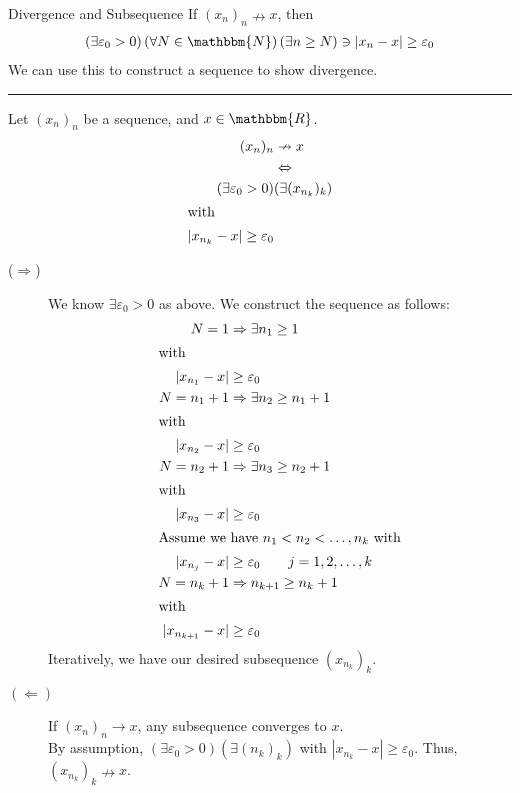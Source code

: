 \documentclass[10pt]{extarticle}
\newcommand{\N}{\mathbbm{N}}
\newcommand{\R}{\mathbbm{R}}
\begin{document}
  \begin{problem}{Divergence and Subsequence}
    If $(x_n)_n \nrightarrow x$, then
    \begin{align*}
      \left(\exists \varepsilon_0> 0\right)\left(\forall N\in\N\right)\left(\exists n\geq N\right) \ni |x_n-x| \geq \varepsilon_0
    \end{align*}
    We can use this to construct a sequence to show divergence.\\
    \vspace{4pt}
    \rule{\textwidth}{0.4pt}
    \vspace{4pt}
    Let $(x_n)_n$ be a sequence, and $x\in\R$.
    \begin{align*}
      (x_n)_n &\nrightarrow x \\
              &\Leftrightarrow\\
      (\exists \varepsilon_0>0)&(\exists (x_{n_k})_k)\\
      \shortintertext{with}
      |x_{n_k} - x| \geq \varepsilon_0
    \end{align*}
    \tcblower
    \begin{description}
      \item[($\Rightarrow$)] We know $\exists \varepsilon_0 > 0$ as above. We construct the sequence as follows:
        \begin{align*}
          N = 1 &\Rightarrow \exists n_1 \geq 1\\
          \shortintertext{with}
          |x_{n_1} - x |&\geq \varepsilon_0\\
          N = n_1 + 1 &\Rightarrow \exists n_2 \geq n_1 + 1\\
          \shortintertext{with}
          |x_{n_2} - x| &\geq \varepsilon_0\\
          N = n_2 + 1 &\Rightarrow \exists n_3 \geq n_2 + 1\\
          \shortintertext{with}
          |x_{n_3} - x| &\geq \varepsilon_0\\
          \shortintertext{Assume we have $n_1 < n_2< \dots, n_k$ with}
          |x_{n_j} - x| &\geq \varepsilon_0 \tag*{$j = 1,2,\dots,k$}\\
          N = n_k + 1 &\Rightarrow n_{k+1} \geq n_k + 1\\
          \shortintertext{with}
          |x_{n_{k+1}} - x| &\geq \varepsilon_0
        \end{align*}
        Iteratively, we have our desired subsequence $(x_{n_k})_k$.
      \item[$(\Leftarrow)$] If $(x_n)_n\rightarrow x$, any subsequence converges to $x$.\\

        By assumption, $\left(\exists \varepsilon_0 >0\right)\left(\exists (n_k)_k\right)$ with $|x_{n_k} - x| \geq \varepsilon_0$. Thus, $(x_{n_k})_k \nrightarrow x$.
    \end{description}
  \end{problem}
\end{document}
